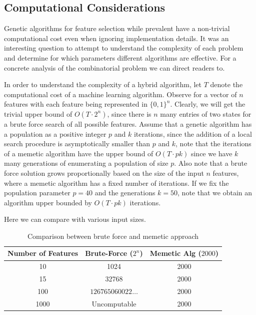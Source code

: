 \documentclass[conference]{IEEEtran}
\begin{document}
\subsection{Computational Considerations}

Genetic algorithms for feature selection while prevalent have a non-trivial computational cost even when ignoring implementation details. It was an interesting question to attempt to understand the complexity of each problem and determine for which parameters different algorithms are effective. For a concrete analysis of the combinatorial problem we can direct readers to\cite{MathiesonEtAl2017,CottaMoscato2003}.

In order to understand the complexity of a hybrid algorithm, let $T$ denote the computational cost of a machine learning algorithm. Observe for a vector of $n$ features with each feature being represented in $\{0,1\}^{n}$. Clearly, we will get the trivial upper bound of $O(T\cdot 2^{n})$, since there is $n$ many entries of two states for a brute force search of all possible features. Assume that a genetic algorithm has a population as a positive integer $p$ and $k$ iterations, since the addition of a local search procedure is asymptotically smaller than $p$ and $k$, note that the iterations of a memetic algorithm have the upper bound of $O(T\cdot pk)$ since we have $k$ many generations of enumerating a population of size $p$. Also note that a brute force solution grows proportionally based on the size of the input $n$ features, where a memetic algorithm has a fixed number of iterations. If we fix the population parameter $p=40$ and the generations $k=50$, note that we obtain an algorithm upper bounded by $O(T\cdot pk)$ iterations.

Here we can compare with various input sizes.

\begin{table}[h!]
	\begin{center}
		\begin{tabular}{| c c c |}
			\hline
			Number of Features & Brute-Force ($2^{n}$) & Memetic Alg ($2000$) \\ [0.5ex]
			\hline
			10                 & 1024                  & 2000                 \\
			15                 & 32768                 & 2000                 \\
			100                & $126765060022\ldots$  & 2000                 \\
			1000               & Uncomputable          & 2000                 \\
			\hline
		\end{tabular}
	\end{center}
	\caption{Comparison between brute force and memetic approach}
	\label{table:memetic-brute-force}
\end{table}
\end{document}
